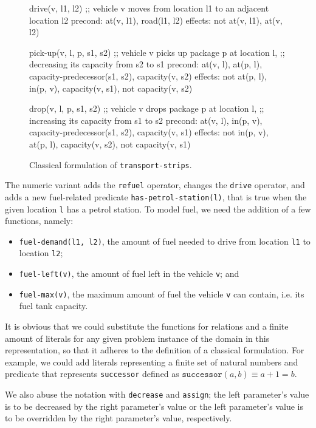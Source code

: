 \begin{figure}[tbp]
\begin{code}
drive(v, l1, l2)
  ;; vehicle v moves from location l1 to an adjacent location l2
  precond: at(v, l1), road(l1, l2)
  effects: not at(v, l1), at(v, l2)

pick-up(v, l, p, s1, s2)
  ;; vehicle v picks up package p at location l,
  ;; decreasing its capacity from s2 to s1
  precond: at(v, l), at(p, l), capacity-predecessor(s1, s2),
           capacity(v, s2)
  effects: not at(p, l), in(p, v), capacity(v, s1),
           not capacity(v, s2)
  
drop(v, l, p, s1, s2)
  ;; vehicle v drops package p at location l,
  ;; increasing its capacity from s1 to s2
  precond: at(v, l), in(p, v), capacity-predecessor(s1, s2),
           capacity(v, s1)
  effects: not in(p, v), at(p, l), capacity(v, s2),
           not capacity(v, s1)
\end{code}
\caption{Classical formulation of \texttt{transport-strips}.}
\label{code:classical-strips}
\end{figure}

The numeric variant  adds the \verb+refuel+ operator, changes the \verb+drive+
operator, and adds a new fuel-related predicate \verb+has-petrol-station(l)+, that is true when the given location \verb+l+ has
a petrol station.
To model fuel, we need the addition of a few functions, namely:

\begin{itemize}
\item \verb+fuel-demand(l1, l2)+, the amount of fuel needed to drive
from location \verb+l1+ to location \verb+l2+;
\item \verb+fuel-left(v)+, the amount of fuel left in
the vehicle \verb+v+; and
\item \verb+fuel-max(v)+, the maximum amount of fuel
the vehicle \verb+v+ can contain, i.e. its fuel tank capacity.
\end{itemize}

It is obvious that we could substitute the functions for relations
and a finite amount of literals for any given problem instance of
the domain in this representation,
so that it adheres to the definition of a classical formulation.
For example, we could add literals representing a finite set of
natural numbers and predicate that represents
\verb+successor+ defined as $\texttt{successor}(a, b) \equiv a + 1 = b$.

We also abuse the notation with \verb+decrease+ and \verb+assign+;
the left parameter's value is to be decreased by the right
parameter's value or the left parameter's value is to be overridden
by the right parameter's value, respectively.

